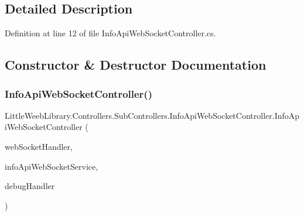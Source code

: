 \subsection{Detailed Description}


Definition at line 12 of file Info\+Api\+Web\+Socket\+Controller.\+cs.



\subsection{Constructor \& Destructor Documentation}
\mbox{\label{class_little_weeb_library_1_1_controllers_1_1_sub_controllers_1_1_info_api_web_socket_controller_a7c884b59b148f11761492b39619acf32}} 
\subsubsection{\texorpdfstring{Info\+Api\+Web\+Socket\+Controller()}{InfoApiWebSocketController()}}
{\footnotesize\ttfamily Little\+Weeb\+Library.\+Controllers.\+Sub\+Controllers.\+Info\+Api\+Web\+Socket\+Controller.\+Info\+Api\+Web\+Socket\+Controller (\begin{DoxyParamCaption}\item[{\mbox{\hyperlink{interface_little_weeb_library_1_1_handlers_1_1_i_web_socket_handler}{I\+Web\+Socket\+Handler}}}]{web\+Socket\+Handler,  }\item[{\mbox{\hyperlink{interface_little_weeb_library_1_1_services_1_1_i_info_api_web_socket_service}{I\+Info\+Api\+Web\+Socket\+Service}}}]{info\+Api\+Web\+Socket\+Service,  }\item[{\mbox{\hyperlink{interface_little_weeb_library_1_1_handlers_1_1_i_debug_handler}{I\+Debug\+Handler}}}]{debug\+Handler }\end{DoxyParamCaption})}



